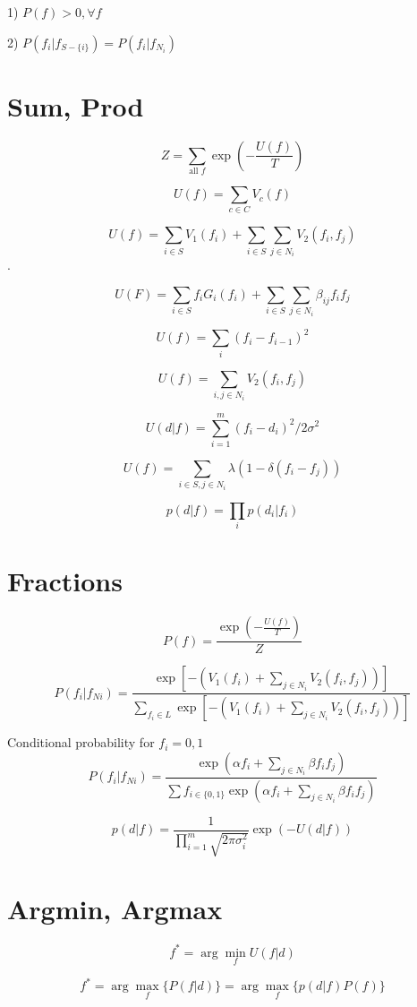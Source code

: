 \documentclass{article}
\begin{document}
1) $P(f) > 0, \forall f$

2) $P(f_i | f_{S-\{i\}}) = P(f_i | f_{N_i})$

\section{Sum, Prod}

$$Z=\sum_{\text{all }f} \exp \left( {-\frac{U(f)}{T}} \right)$$ 

$$U(f) = \sum_{c\in C} V_c(f)$$ 

$$U(f) = \sum_{i \in S}V_1(f_i) + \sum_{i \in S}\sum_{j \in N_i} V_2(f_i,
f_j)$$.

$$U(F)  = \sum_{i \in S} f_i G_i(f_i) + \sum_{i \in S}\sum_{j \in N_i}
\beta_{ij} f_i f_j$$

$$U(f) = \sum_i (f_i - f_{i-1})^2$$ 

$$U(f) = \sum_{i,j\in N_i} V_2(f_i,f_j)$$

$$U(d|f) = \sum_{i=1}^m (f_i - d_i)^2 / 2 \sigma^2$$

$$
U(f) = \sum_{i\in S, j \in N_i}\lambda(1-\delta(f_i-f_j))
$$

$$p(d|f)=\prod_i p(d_i | f_i)$$

\section{Fractions}

$$P(f) = \frac{\exp \left( -\frac{U(f)}{T}\right)}{Z}$$

$$
P(f_i | f_{Ni}) =
\frac
{\exp \left[  -\left(V_1(f_i)+ \sum_{j \in N_i} V_2(f_i, f_j) \right)
\right] }
{\sum_{f_i \in L }\exp \left[ - \left(V_1(f_i)+ \sum_{j \in N_i} V_2(f_i, f_j)
\right) \right]}
$$

Conditional probability for $f_i=0,1$
$$
P(f_i | f_{Ni}) = 
\frac
{\exp \left(  \alpha f_i + \sum_{j \in N_i}  \beta f_i f_j  \right) }
{ \sum f_{i \in \{0,1\}} \exp \left(  \alpha f_i + \sum_{j
\in N_i}  \beta f_i f_j  \right)}
$$

$$p(d|f) = \frac{1}{\prod_{i=1}^{m} \sqrt{2 \pi \sigma_i^2}} \exp(-U(d|f))$$

\section{Argmin, Argmax}

$$
f^* = \arg \min_f U(f|d)
$$

$$
f^* =  \arg \max_f \{ P(f|d) \} = \arg \max_f \{ p(d|f) P(f) \}
$$
\end{document}
